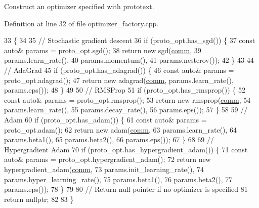 Construct an optimizer specified with prototext. 

Definition at line 32 of file optimizer\+\_\+factory.\+cpp.


\begin{DoxyCode}
33                                                                      \{
34 
35   \textcolor{comment}{// Stochastic gradient descent}
36   \textcolor{keywordflow}{if} (proto\_opt.has\_sgd()) \{
37     \textcolor{keyword}{const} \textcolor{keyword}{auto}& params = proto\_opt.sgd();
38     \textcolor{keywordflow}{return} \textcolor{keyword}{new} sgd(\hyperlink{file__io_8cpp_ab048c6f9fcbcfaa57ce68b00263dbebe}{comm},
39                    params.learn\_rate(),
40                    params.momentum(),
41                    params.nesterov());
42   \}
43 
44   \textcolor{comment}{// AdaGrad}
45   \textcolor{keywordflow}{if} (proto\_opt.has\_adagrad()) \{
46     \textcolor{keyword}{const} \textcolor{keyword}{auto}& params = proto\_opt.adagrad();
47     \textcolor{keywordflow}{return} \textcolor{keyword}{new} adagrad(\hyperlink{file__io_8cpp_ab048c6f9fcbcfaa57ce68b00263dbebe}{comm}, params.learn\_rate(), params.eps());
48   \}
49 
50   \textcolor{comment}{// RMSProp}
51   \textcolor{keywordflow}{if} (proto\_opt.has\_rmsprop()) \{
52     \textcolor{keyword}{const} \textcolor{keyword}{auto}& params = proto\_opt.rmsprop();
53     \textcolor{keywordflow}{return} \textcolor{keyword}{new} rmsprop(\hyperlink{file__io_8cpp_ab048c6f9fcbcfaa57ce68b00263dbebe}{comm},
54                        params.learn\_rate(),
55                        params.decay\_rate(),
56                        params.eps());
57   \}
58 
59   \textcolor{comment}{// Adam}
60   \textcolor{keywordflow}{if} (proto\_opt.has\_adam()) \{
61     \textcolor{keyword}{const} \textcolor{keyword}{auto}& params = proto\_opt.adam();
62     \textcolor{keywordflow}{return} \textcolor{keyword}{new} adam(\hyperlink{file__io_8cpp_ab048c6f9fcbcfaa57ce68b00263dbebe}{comm},
63                     params.learn\_rate(),
64                     params.beta1(),
65                     params.beta2(),
66                     params.eps());
67   \}
68 
69   \textcolor{comment}{// Hypergradient Adam}
70   \textcolor{keywordflow}{if} (proto\_opt.has\_hypergradient\_adam()) \{
71     \textcolor{keyword}{const} \textcolor{keyword}{auto}& params = proto\_opt.hypergradient\_adam();
72     \textcolor{keywordflow}{return} \textcolor{keyword}{new} hypergradient\_adam(\hyperlink{file__io_8cpp_ab048c6f9fcbcfaa57ce68b00263dbebe}{comm},
73                                   params.init\_learning\_rate(),
74                                   params.hyper\_learning\_rate(),
75                                   params.beta1(),
76                                   params.beta2(),
77                                   params.eps());
78   \}
79 
80   \textcolor{comment}{// Return null pointer if no optimizer is specified}
81   \textcolor{keywordflow}{return} \textcolor{keyword}{nullptr};
82 
83 \}
\end{DoxyCode}
